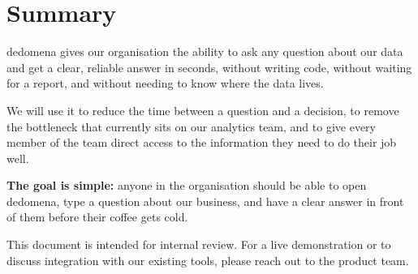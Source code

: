 \documentclass[12pt, a4paper]{article}
\begin{document}
\section{Summary}

dedomena gives our organisation the ability to ask any question about our data and
get a clear, reliable answer in seconds, without writing code, without waiting for
a report, and without needing to know where the data lives.

We will use it to reduce the time between a question and a decision, to remove the
bottleneck that currently sits on our analytics team, and to give every member of
the team direct access to the information they need to do their job well.

\begin{callout}
  \textbf{The goal is simple:} anyone in the organisation should be able to open
  dedomena, type a question about our business, and have a clear answer in front
  of them before their coffee gets cold.
\end{callout}

\vspace{2em}
\textcolor{mutedtext}{\small This document is intended for internal review. For a
live demonstration or to discuss integration with our existing tools, please reach
out to the product team.}
\end{document}

